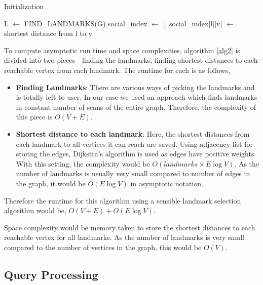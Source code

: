\begin{algorithm}[t]
\caption{{\grpsocial}  Initialization}
\begin{scriptsize}
\label{alg2}
\begin{algorithmic}[1]

  \State L $\gets$ FIND\_LANDMARKS(G) 
  \State social\_index $\gets$ []
	  	\State social\_index[l][v] $\gets $ shortest distance from l to v
	\EndFor
  \EndFor
\EndFunction
\end{algorithmic}

\end{scriptsize}
\end{algorithm}

To compute asymptotic run time and space complexities, algorithm \ref{alg2} is divided into two pieces - finding the landmarks, finding shortest distances to each reachable vertex from each landmark. The runtime for each is as follows,
\begin{itemize}
	\item \textbf{Finding Landmarks}: There are various ways of picking the landmarks and is totally left to user. In our case we used an approach which finds landmarks in constant number of scans of the entire graph. Therefore, the complexity of this piece is $O(V + E)$.

	\item \textbf{Shortest distance to each landmark}: Here, the shortest distances from each landmark to all vertices it can reach are saved. Using adjacency list for storing the edges, Dijkstra's algorithm is used as edges have positive weights. With this setting, the complexity would be $O(landmarks \times E\log V)$. As the number of landmarks is usually very small compared to number of edges in the graph, it would be $O(E\log V)$ in asymptotic notation.
\end{itemize}

Therefore the runtime for this algorithm using a sensible landmark selection algorithm would be, $O(V + E) + O(E\log V)$.

Space complexity would be memory taken to store the shortest distances to each reachable vertex for all landmarks. As the number of landmarks is very small compared to the number of vertices in the graph, this would be $O(V)$.

\subsection{Query Processing} \label{querying}

